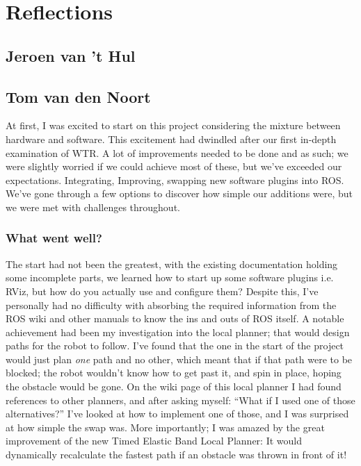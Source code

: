 \section{Reflections}
\subsection{Jeroen van 't Hul}

\newpage

\subsection{Tom van den Noort}
At first, I was excited to start on this project considering the mixture between hardware and software. 
This excitement had dwindled after our first in-depth examination of WTR. 
A lot of improvements needed to be done and as such; we were slightly worried if we could achieve most of these, but we've exceeded our expectations.
Integrating, Improving, swapping new software plugins into ROS. We've gone through a few options to discover how simple our additions were, but we were met with challenges throughout.

\subsubsection{What went well?}
The start had not been the greatest, with the existing documentation holding some incomplete parts, we learned how to start up some software plugins i.e. RViz, but how do you actually use and configure them? 
Despite this, I've personally had no difficulty with absorbing the required information from the ROS wiki and other manuals to know the ins and outs of ROS itself. 
A notable achievement had been my investigation into the local planner; that would design paths for the robot to follow.
I've found that the one in the start of the project would just plan \textit{one} path and no other, which meant that if that path were to be blocked; the robot wouldn't know how to get past it, and spin in place, hoping the obstacle would be gone.
On the wiki page of this local planner I had found references to other planners, and after asking myself: ``What if I used one of those alternatives?'' I've looked at how to implement one of those, and I was surprised at how simple the swap was. 
More importantly; I was amazed by the great improvement of the new Timed Elastic Band Local Planner: It would dynamically recalculate the fastest path if an obstacle was thrown in front of it!

